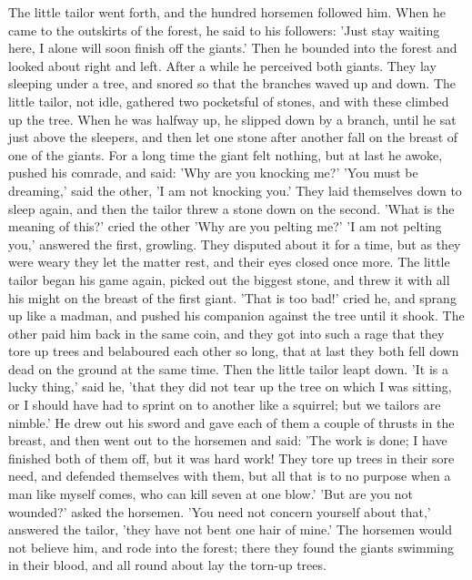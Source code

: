 \documentclass[12pt]{book}
\begin{document}
The little tailor went forth, and the hundred horsemen followed him.
When he came to the outskirts of the forest, he said to his followers:
'Just stay waiting here, I alone will soon finish off the giants.'
Then he bounded into the forest and looked about right and left. After
a while he perceived both giants. They lay sleeping under a tree, and
snored so that the branches waved up and down. The little tailor, not
idle, gathered two pocketsful of stones, and with these climbed up the
tree. When he was halfway up, he slipped down by a branch, until he
sat just above the sleepers, and then let one stone after another fall
on the breast of one of the giants. For a long time the giant felt
nothing, but at last he awoke, pushed his comrade, and said: 'Why are
you knocking me?' 'You must be dreaming,' said the other, 'I am not
knocking you.' They laid themselves down to sleep again, and then the
tailor threw a stone down on the second. 'What is the meaning of
this?' cried the other 'Why are you pelting me?' 'I am not pelting
you,' answered the first, growling. They disputed about it for a time,
but as they were weary they let the matter rest, and their eyes closed
once more. The little tailor began his game again, picked out the
biggest stone, and threw it with all his might on the breast of the
first giant. 'That is too bad!' cried he, and sprang up like a madman,
and pushed his companion against the tree until it shook. The other
paid him back in the same coin, and they got into such a rage that
they tore up trees and belaboured each other so long, that at last
they both fell down dead on the ground at the same time. Then the
little tailor leapt down. 'It is a lucky thing,' said he, 'that they
did not tear up the tree on which I was sitting, or I should have had
to sprint on to another like a squirrel; but we tailors are nimble.'
He drew out his sword and gave each of them a couple of thrusts in the
breast, and then went out to the horsemen and said: 'The work is done;
I have finished both of them off, but it was hard work! They tore up
trees in their sore need, and defended themselves with them, but all
that is to no purpose when a man like myself comes, who can kill seven
at one blow.' 'But are you not wounded?' asked the horsemen. 'You need
not concern yourself about that,' answered the tailor, 'they have not
bent one hair of mine.' The horsemen would not believe him, and rode
into the forest; there they found the giants swimming in their blood,
and all round about lay the torn-up trees.
\end{document}
